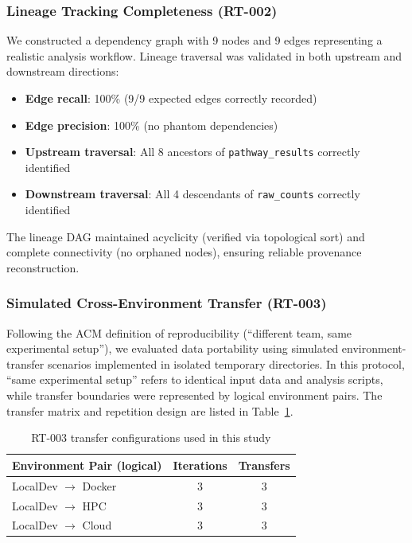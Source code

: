 \documentclass[11pt,a4paper]{article}
\begin{document}
\subsubsection{Lineage Tracking Completeness (RT-002)}

We constructed a dependency graph with 9 nodes and 9 edges representing a realistic analysis workflow. Lineage traversal was validated in both upstream and downstream directions:

\begin{itemize}
    \item \textbf{Edge recall}: 100\% (9/9 expected edges correctly recorded)
    \item \textbf{Edge precision}: 100\% (no phantom dependencies)
    \item \textbf{Upstream traversal}: All 8 ancestors of \texttt{pathway\_results} correctly identified
    \item \textbf{Downstream traversal}: All 4 descendants of \texttt{raw\_counts} correctly identified
\end{itemize}

The lineage DAG maintained acyclicity (verified via topological sort) and complete connectivity (no orphaned nodes), ensuring reliable provenance reconstruction.

\subsubsection{Simulated Cross-Environment Transfer (RT-003)}

Following the ACM definition of reproducibility (``different team, same experimental setup''), we evaluated data portability using simulated environment-transfer scenarios implemented in isolated temporary directories. In this protocol, ``same experimental setup'' refers to identical input data and analysis scripts, while transfer boundaries were represented by logical environment pairs. The transfer matrix and repetition design are listed in Table~\ref{tab:rt003_config}.

\begin{table}[H]
\centering
\caption{RT-003 transfer configurations used in this study}
\label{tab:rt003_config}
\begin{tabular}{lcc}
\toprule
\textbf{Environment Pair (logical)} & \textbf{Iterations} & \textbf{Transfers} \\
\midrule
LocalDev $\rightarrow$ Docker & 3 & 3 \\
LocalDev $\rightarrow$ HPC & 3 & 3 \\
LocalDev $\rightarrow$ Cloud & 3 & 3 \\
\bottomrule
\end{tabular}
\end{table}
\end{document}
